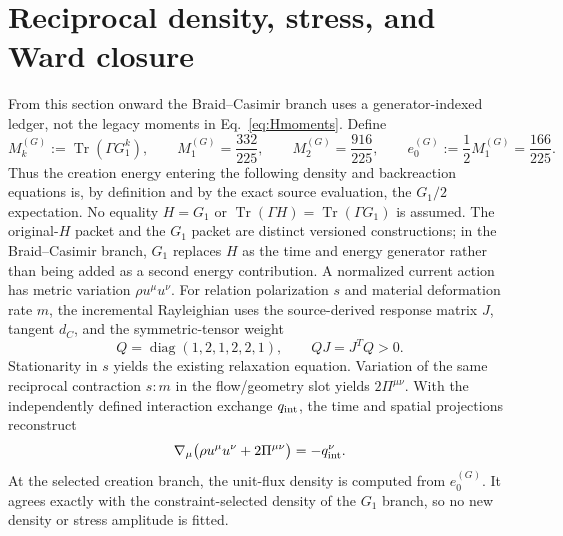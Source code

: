 \documentclass[11pt]{article}
\theoremstyle{definition}
\theoremstyle{remark}
\newcommand{\Tr}{\operatorname{Tr}}
\begin{document}
\section{Reciprocal density, stress, and Ward closure}

From this section onward the Braid--Casimir branch uses a generator-indexed ledger, not the legacy moments in Eq.~\eqref{eq:Hmoments}. Define
\begin{equation}\label{eq:Gmoments}
 M_k^{(G)}:=\Tr(\Gamma G_1^k),\qquad
 M_1^{(G)}=\frac{332}{225},\qquad
 M_2^{(G)}=\frac{916}{225},\qquad
 e_0^{(G)}:=\frac12M_1^{(G)}=\frac{166}{225}.
\end{equation}
Thus the creation energy entering the following density and backreaction equations is, by definition and by the exact source evaluation, the $G_1/2$ expectation. No equality $H=G_1$ or $\Tr(\Gamma H)=\Tr(\Gamma G_1)$ is assumed. The original-$H$ packet and the $G_1$ packet are distinct versioned constructions; in the Braid--Casimir branch, $G_1$ replaces $H$ as the time and energy generator rather than being added as a second energy contribution.
A normalized current action has metric variation $\rho u^\mu u^\nu$. For relation polarization $s$ and material deformation rate $m$, the incremental Rayleighian uses the source-derived response matrix $J$, tangent $d_C$, and the symmetric-tensor weight
\begin{equation}
 Q=\operatorname{diag}(1,2,1,2,2,1),
 \qquad QJ=J^TQ>0.
\end{equation}
Stationarity in $s$ yields the existing relaxation equation. Variation of the same reciprocal contraction $s:m$ in the flow/geometry slot yields $2\Pi^{\mu\nu}$. With the independently defined interaction exchange $q_{\rm int}$, the time and spatial projections reconstruct
\begin{equation}\label{eq:ward}
 \nabla_\mu\bigl(\rho u^\mu u^\nu+2\Pi^{\mu\nu}\bigr)=-q_{\rm int}^{\nu}.
\end{equation}
At the selected creation branch, the unit-flux density is computed from $e_0^{(G)}$. It agrees exactly with the constraint-selected density of the $G_1$ branch, so no new density or stress amplitude is fitted.
\end{document}
